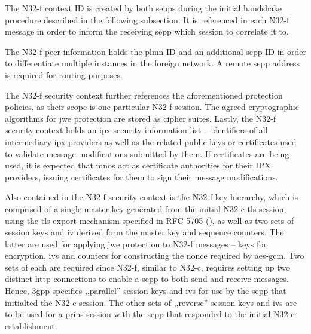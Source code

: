 The N32-f context ID is created by both \glspl{sepp} during the initial handshake procedure described in the following subsection.
It is referenced in each N32-f message in order to inform the receiving \gls{sepp} which session to correlate it to.

The N32-f peer information holds the \gls{plmn} ID and an additional \gls{sepp} ID in order to differentiate multiple instances in the foreign network.
A remote \gls{sepp} address is required for routing purposes.

The N32-f security context further references the aforementioned protection policies, as their scope is one particular N32-f session.
The agreed cryptographic algorithms for \gls{jwe} protection are stored as cipher suites.
Lastly, the N32-f security context holds an \gls{ipx} security information list -- identifiers of all intermediary \gls{ipx} providers as well as the related  public keys or certificates used to validate message modifications submitted by them.
If certificates are being used, it is expected that \glspl{mno} act as certificate authorities for their IPX providers, issuing certificates for them to sign their message modifications.

Also contained in the N32-f security context is the N32-f key hierarchy, which is comprised of a single master key generated from the initial N32-c \gls{tls} session, using the \gls{tls} export mechanism specified in RFC 5705 (\cite{rfc5705}), as well as two sets of session keys and \gls{iv} derived form the master key and sequence counters.
The latter are used for applying \gls{jwe} protection to N32-f messages -- keys for encryption, \glspl{iv} and counters for constructing the nonce required by \gls{aes}-\gls{gcm}.
Two sets of each are required since N32-f, similar to N32-c, requires setting up two distinct \gls{http} connections to enable a \gls{sepp} to both send and receive messages.
Hence, \gls{3gpp} specifies ,,parallel'' session keys and \glspl{iv} for use by the \gls{sepp} that initialted the N32-c session.
The other sets of ,,reverse'' session keys and \glspl{iv} are to be used for a \gls{prins} session with the \gls{sepp} that responded to the initial N32-c establishment.
\\

